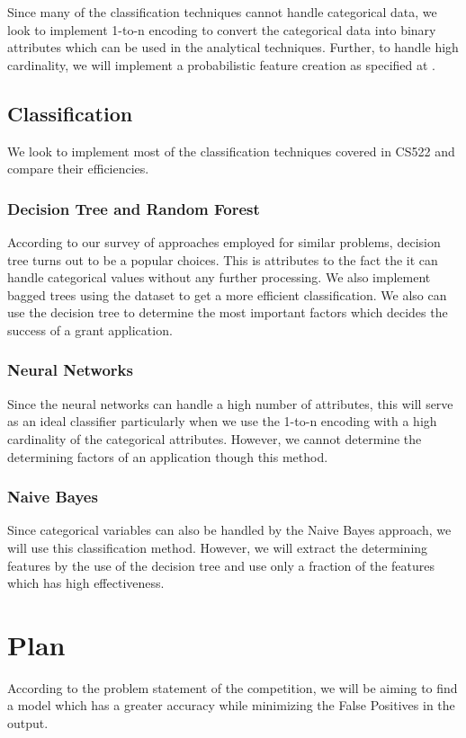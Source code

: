 \documentclass{article} %
\begin{document}
Since many of the classification techniques cannot handle categorical data, we look to implement 1-to-n encoding to convert the categorical data into binary attributes which can be used in the analytical techniques. Further, to handle high cardinality, we will implement a probabilistic feature creation as specified at \cite{HighCard}. 

\subsection{Classification}

We look to implement most of the classification techniques covered in CS522 and compare their efficiencies.

\subsubsection{Decision Tree and Random Forest}
According to our survey of approaches employed for similar problems, decision tree turns out to be a popular choices. This is attributes to the fact the it can handle categorical values without any further processing. We also implement bagged trees using the dataset to get a more efficient classification. We also can use the decision tree to determine the most important factors which decides the success of a grant application.

\subsubsection{Neural Networks}
Since the neural networks can handle a high number of attributes, this will serve as an ideal classifier particularly when we use the 1-to-n encoding with a high cardinality of the categorical attributes. However, we cannot determine the determining factors of an application though this method.

\subsubsection{Naive Bayes}
Since categorical variables can also be handled by the Naive Bayes approach, we will use this classification method. However, we will extract the determining features by the use of the decision tree and use only a fraction of the features which has high effectiveness. 


\section{Plan}
According to the problem statement of the competition, we will be aiming to find a model which has a greater accuracy while minimizing the False Positives in the output.
\end{document}
